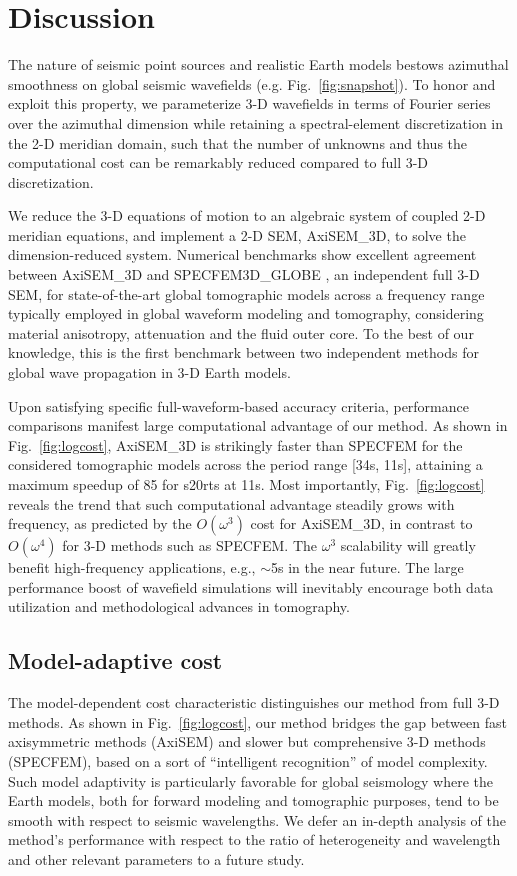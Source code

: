 \documentclass[extra,referee]{gji}
\begin{document}
\section{Discussion}
The nature of seismic point sources and realistic Earth models 
bestows azimuthal smoothness on global seismic wavefields (e.g. Fig.~\ref{fig:snapshot}). 
To honor and exploit this property, we parameterize 3-D wavefields
in terms of Fourier series over the azimuthal dimension while
retaining a spectral-element discretization in the 2-D meridian domain,
such that the number of unknowns and thus the computational cost 
can be remarkably reduced compared to full 3-D discretization.

We reduce the 3-D equations of motion to 
an algebraic system of coupled 2-D meridian equations,
and implement a 2-D SEM, AxiSEM\_3D, to solve the dimension-reduced system.
Numerical benchmarks show excellent agreement 
between AxiSEM\_3D and SPECFEM3D\_GLOBE 
\cite[]{komatitsch2002spectralI,komatitsch2002spectralII},
an independent full 3-D SEM, 
for state-of-the-art global tomographic models
across a frequency range typically employed in global waveform modeling 
and tomography, considering material anisotropy, attenuation and the fluid outer core. 
To the best of our knowledge, this is the first benchmark
between two independent methods for global wave propagation in 3-D Earth models. 

Upon satisfying specific full-waveform-based accuracy criteria, 
performance comparisons manifest large computational advantage of our method.
As shown in Fig.~\ref{fig:logcost}, AxiSEM\_3D is strikingly faster than SPECFEM
for the considered tomographic models across the period range [34s, 11s], 
attaining a maximum speedup of 85 for s20rts at 11s. 
Most importantly, Fig.~\ref{fig:logcost} reveals the trend that such 
computational advantage steadily grows with frequency, 
as predicted by the $O(\omega^3)$ cost
for AxiSEM\_3D, in contrast to $O(\omega^4)$ for 3-D methods such as SPECFEM.
The $\omega^3$ scalability will greatly benefit high-frequency applications,
e.g., $\sim$5s in the near future. 
The large performance boost of wavefield simulations will inevitably 
encourage both data utilization and methodological advances in tomography.  

\subsection{Model-adaptive cost}
\label{sec:adapt}
The model-dependent cost characteristic distinguishes our method from 
full 3-D methods. As shown in Fig.~\ref{fig:logcost}, our method 
bridges the gap between fast axisymmetric methods (AxiSEM) and 
slower but comprehensive 3-D methods (SPECFEM), based on a sort of 
``intelligent recognition'' of model complexity. Such model adaptivity
is particularly favorable for global seismology where 
the Earth models, both for forward modeling and tomographic purposes,  
tend to be smooth with respect to seismic wavelengths. 
We defer an in-depth analysis of the method's performance with respect to 
the ratio of heterogeneity and wavelength and other relevant 
parameters to a future study.
\end{document}
